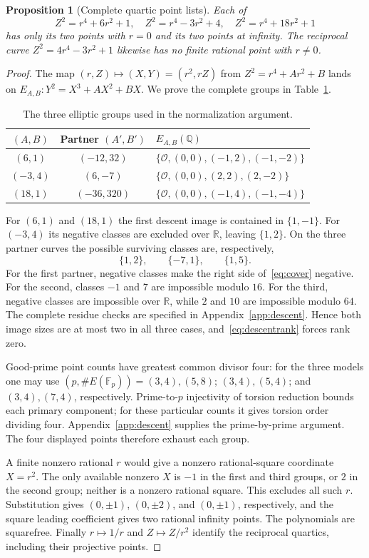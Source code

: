 \documentclass[11pt,letterpaper]{article}
\newtheorem{proposition}[theorem]{Proposition}
\theoremstyle{definition}\newtheorem{definition}[theorem]{Definition}
\theoremstyle{remark}\newtheorem{remark}[theorem]{Remark}
\newcommand{\Q}{\mathbb Q}\newcommand{\Z}{\mathbb Z}\newcommand{\R}{\mathbb R}
\newcommand{\F}{\mathbb F}\newcommand{\T}{\mathbb T}\newcommand{\PP}{\mathbf P^1}
\begin{document}
\begin{proposition}[Complete quartic point lists]\label{prop:quartics}
Each of
\[
 Z^2=r^4+6r^2+1,\quad
 Z^2=r^4-3r^2+4,\quad
 Z^2=r^4+18r^2+1
\]
has only its two points with $r=0$ and its two points at infinity. The reciprocal curve $Z^2=4r^4-3r^2+1$ likewise has no finite rational point with $r\ne0$.
\end{proposition}
\begin{proof}
The map $(r,Z)\mapsto(X,Y)=(r^2,rZ)$ from $Z^2=r^4+Ar^2+B$ lands on $E_{A,B}:Y^2=X^3+AX^2+BX$. We prove the complete groups in Table~\ref{tab:groups}.
\begin{table}[htbp]
\centering\small
\begin{tabular}{ccl}
\toprule
$(A,B)$ & Partner $(A',B')$ & $E_{A,B}(\Q)$\\
\midrule
$(6,1)$ & $(-12,32)$ & $\{\mathcal O,(0,0),(-1,2),(-1,-2)\}$\\
$(-3,4)$ & $(6,-7)$ & $\{\mathcal O,(0,0),(2,2),(2,-2)\}$\\
$(18,1)$ & $(-36,320)$ & $\{\mathcal O,(0,0),(-1,4),(-1,-4)\}$\\
\bottomrule
\end{tabular}
\caption{The three elliptic groups used in the normalization argument.}\label{tab:groups}
\end{table}
For $(6,1)$ and $(18,1)$ the first descent image is contained in $\{1,-1\}$. For $(-3,4)$ its negative classes are excluded over $\R$, leaving $\{1,2\}$. On the three partner curves the possible surviving classes are, respectively,
\[
 \{1,2\},\qquad\{-7,1\},\qquad\{1,5\}.
\]
For the first partner, negative classes make the right side of~\eqref{eq:cover} negative. For the second, classes $-1$ and $7$ are impossible modulo $16$. For the third, negative classes are impossible over $\R$, while $2$ and $10$ are impossible modulo $64$. The complete residue checks are specified in Appendix~\ref{app:descent}. Hence both image sizes are at most two in all three cases, and~\eqref{eq:descentrank} forces rank zero.

Good-prime point counts have greatest common divisor four: for the three models one may use $(p,\#E(\F_p))=(3,4),(5,8)$; $(3,4),(5,4)$; and $(3,4),(7,4)$, respectively. Prime-to-$p$ injectivity of torsion reduction bounds each primary component; for these particular counts it gives torsion order dividing four. Appendix~\ref{app:descent} supplies the prime-by-prime argument. The four displayed points therefore exhaust each group.

A finite nonzero rational $r$ would give a nonzero rational-square coordinate $X=r^2$. The only available nonzero $X$ is $-1$ in the first and third groups, or $2$ in the second group; neither is a nonzero rational square. This excludes all such $r$. Substitution gives $(0,\pm1)$, $(0,\pm2)$, and $(0,\pm1)$, respectively, and the square leading coefficient gives two rational infinity points. The polynomials are squarefree. Finally $r\mapsto1/r$ and $Z\mapsto Z/r^2$ identify the reciprocal quartics, including their projective points.
\end{proof}
\end{document}
